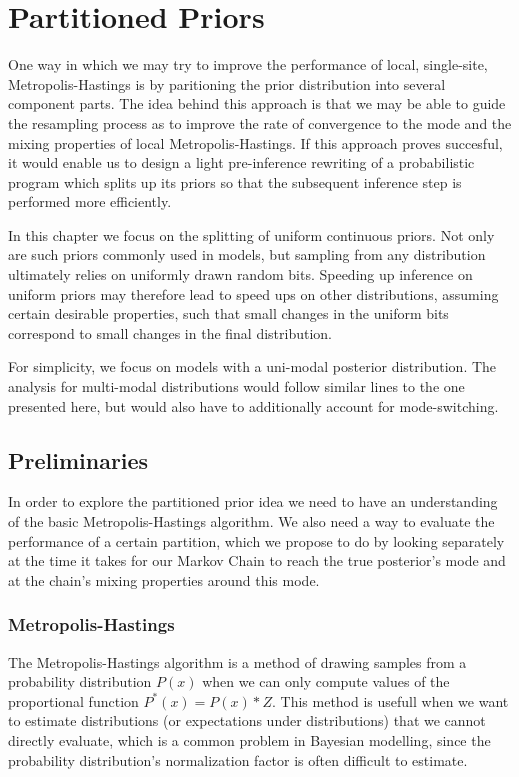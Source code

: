\chapter{Partitioned Priors}

One way in which we may try to improve the performance of local, single-site, Metropolis-Hastings is by paritioning the prior distribution into several component parts. The idea behind this approach is that we may be able to guide the resampling process as to improve the rate of convergence to the mode and the mixing properties of local Metropolis-Hastings.  If this approach proves succesful, it would enable us to design a light pre-inference rewriting of a probabilistic program which splits up its priors so that the subsequent inference step is performed more efficiently.

In this chapter we focus on the splitting of uniform continuous priors. Not only are such priors commonly used in models, but sampling from any distribution ultimately relies on uniformly drawn random bits. Speeding up inference on uniform priors may therefore lead to speed ups on other distributions, assuming certain desirable properties, such that small changes in the uniform bits correspond to small changes in the final distribution. 

For simplicity, we focus on models with a uni-modal posterior distribution. The analysis for multi-modal distributions would follow similar lines to the one presented here, but would also have to additionally account for mode-switching.

\section{Preliminaries}

In order to explore the partitioned prior idea we need to have an understanding of the basic Metropolis-Hastings algorithm. We also need a way to evaluate the performance of a certain partition, which we propose to do by looking separately at the time it takes for our Markov Chain to reach the true posterior's mode and at the chain's mixing properties around this mode.

\subsection{Metropolis-Hastings}
\label{sect:MH}
The Metropolis-Hastings algorithm is a method of drawing samples from a probability distribution $P(x)$ when we can only compute values of the proportional function $P^*(x) = P(x)*Z$. This method is usefull when we want to estimate distributions (or expectations under distributions) that we cannot directly evaluate, which is a common problem in Bayesian modelling, since the probability distribution's normalization factor is often difficult to estimate.

